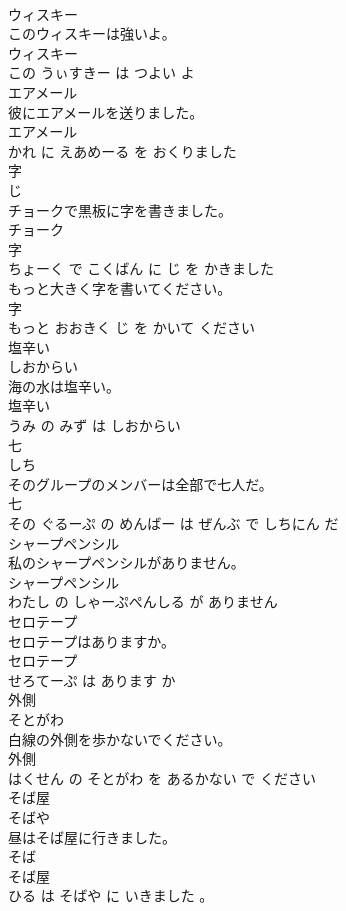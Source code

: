 \documentclass[8pt]{extreport}
\begin{document}
\begin{CJK}{UTF8}{min}
\\	ウィスキー	
\\	このウィスキーは強いよ。	
\\	ウィスキー 
\\	この うぃすきー は つよい よ			
\\	エアメール	
\\	彼にエアメールを送りました。	
\\	エアメール 
\\	かれ に えあめーる を おくりました			
\\	字	
\\	じ			
\\	チョークで黒板に字を書きました。	
\\	チョーク 
\\	字 
\\	ちょーく で こくばん に じ を かきました			
\\	もっと大きく字を書いてください。	
\\	字 
\\	もっと おおきく じ を かいて ください			
\\	塩辛い	
\\	しおからい			
\\	海の水は塩辛い。	
\\	塩辛い 
\\	うみ の みず は しおからい			
\\	七	
\\	しち			
\\	そのグループのメンバーは全部で七人だ。	
\\	七 
\\	その ぐるーぷ の めんばー は ぜんぶ で しちにん だ			
\\	シャープペンシル	
\\	私のシャープペンシルがありません。	
\\	シャープペンシル 
\\	わたし の しゃーぷぺんしる が ありません			
\\	セロテープ	
\\	セロテープはありますか。	
\\	セロテープ 
\\	せろてーぷ は あります か			
\\	外側	
\\	そとがわ			
\\	白線の外側を歩かないでください。	
\\	外側 
\\	はくせん の そとがわ を あるかない で ください			
\\	そば屋	
\\	そばや			
\\	昼はそば屋に行きました。	
\\	そば 
\\	そば屋 
\\	ひる は そばや に いきました 。			
\end{CJK}
\end{document}
